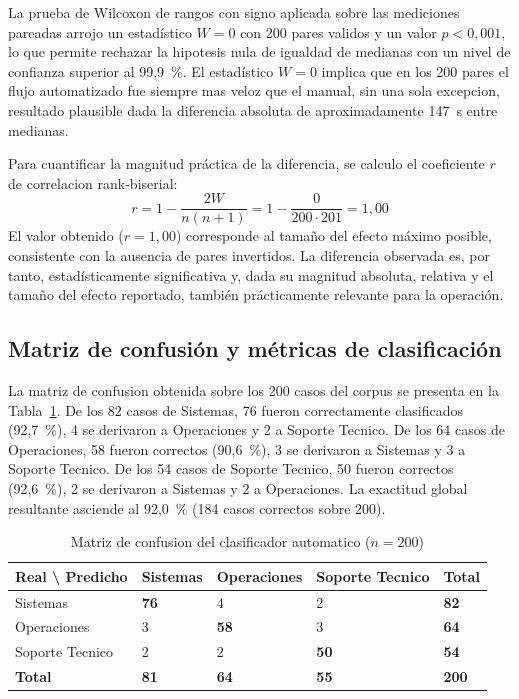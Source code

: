La prueba de Wilcoxon de rangos con signo aplicada sobre las mediciones pareadas arrojo un estadístico \(W = 0\) con 200 pares validos y un valor \(p < 0{,}001\), lo que permite rechazar la hipotesis nula de igualdad de medianas con un nivel de confianza superior al 99,9~\%. El estadístico \(W = 0\) implica que en los 200 pares el flujo automatizado fue siempre mas veloz que el manual, sin una sola excepcion, resultado plausible dada la diferencia absoluta de aproximadamente 147~s entre medianas.

Para cuantificar la magnitud práctica de la diferencia, se calculo el coeficiente \(r\) de correlacion rank-biserial:
\[
r = 1 - \frac{2W}{n(n+1)} = 1 - \frac{0}{200 \cdot 201} = 1{,}00
\]
El valor obtenido (\(r = 1{,}00\)) corresponde al tamaño del efecto máximo posible, consistente con la ausencia de pares invertidos. La diferencia observada es, por tanto, estadísticamente significativa y, dada su magnitud absoluta, relativa y el tamaño del efecto reportado, también prácticamente relevante para la operación.

\subsection{Matriz de confusión y métricas de clasificación}

La matriz de confusion obtenida sobre los 200 casos del corpus se presenta en la Tabla~\ref{tab:matriz}. De los 82 casos de Sistemas, 76 fueron correctamente clasificados (92,7~\%), 4 se derivaron a Operaciones y 2 a Soporte Tecnico. De los 64 casos de Operaciones, 58 fueron correctos (90,6~\%), 3 se derivaron a Sistemas y 3 a Soporte Tecnico. De los 54 casos de Soporte Tecnico, 50 fueron correctos (92,6~\%), 2 se derivaron a Sistemas y 2 a Operaciones. La exactitud global resultante asciende al 92,0~\% (184 casos correctos sobre 200).

\begin{table}[htbp]
\centering
\caption{Matriz de confusion del clasificador automatico (\(n = 200\))}
\label{tab:matriz}
\begin{tabular}{@{}p{3.2cm} p{2.5cm} p{2.5cm} p{2.8cm} p{2.0cm}@{}}
\toprule
\textbf{Real \textbackslash{} Predicho} & \textbf{Sistemas} & \textbf{Operaciones} & \textbf{Soporte Tecnico} & \textbf{Total} \\
\midrule
Sistemas         & \textbf{76} & 4  & 2  & \textbf{82} \\
Operaciones      & 3  & \textbf{58} & 3  & \textbf{64} \\
Soporte Tecnico  & 2  & 2  & \textbf{50} & \textbf{54} \\
\midrule
\textbf{Total}   & \textbf{81} & \textbf{64} & \textbf{55} & \textbf{200} \\
\bottomrule
\end{tabular}
\end{table}

